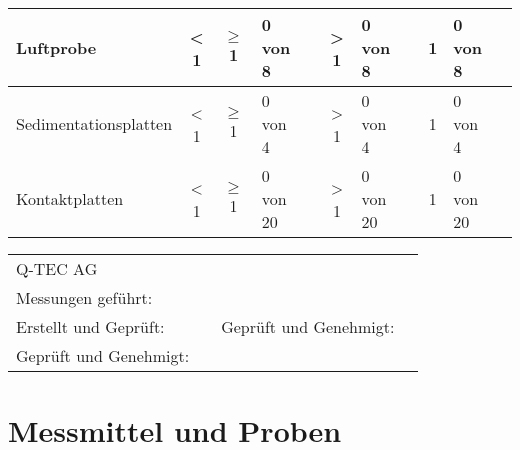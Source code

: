 \vspace{1ex}
\raum \qquad \kklasse \qquad \betriebszustand

\begin{tabularx}{\textwidth}{|l|c|c|X|c|c|X|c|c|X|c|}
	
	\hline
	Luftprobe & 
	< 1  & $\geq$ 1 & 0 von 8 & \CheckBox[print,width=0.6em,height=0.6em,checked,name=ch37]{}& > 1  & 0 von 8 &  \CheckBox[width=0.6em,height=0.6em,checked,name=ch38]{}&
	1 & 0 von 8 &  \CheckBox[print,width=0.6em,height=0.6em,checked,name=ch39]{} \\
	\hline
	Sedimentationsplatten & 
	< 1  & $\geq$ 1 & 0 von 4 & \CheckBox[print,width=0.6em,height=0.6em,checked,name=ch40]{}& > 1  & 0 von 4 &  \CheckBox[width=0.6em,height=0.6em,checked,name=ch41]{}&
	1 & 0 von 4 &  \CheckBox[width=0.6em,height=0.6em,checked,name=ch42]{} \\
	\hline
	Kontaktplatten & 
	< 1  & $\geq$ 1 & 0 von 20 & \CheckBox[print,width=0.6em,height=0.6em,checked,name=ch43]{}& > 1  & 0 von 20 &  \CheckBox[width=0.6em,height=0.6em,checked,name=ch44]{}&
	1 & 0 von 20 &  \CheckBox[print,width=0.6em,height=0.6em,checked,name=ch45]{} \\
	\hline
\end{tabularx}
\vspace{70pt}%


\begin{tabularx}{\textwidth}{p{4.5cm}XXp{4cm}}


	\multicolumn{2}{l}{Q-TEC AG}&	\multicolumn{2}{l}{\small{\kundeline}}\\


	\small{Messungen geführt:} &\underline{\hspace{3cm}} & \multirow{3}{8cm}{\small{Geprüft und Genehmigt:}}& \\


    \small{Erstellt und Geprüft:} &\underline{\hspace{3cm}} & &\qquad \underline{\hspace{3cm}}\\
    \small{Geprüft und Genehmigt:} &\underline{\hspace{3cm}}&&\\
	
	
\end{tabularx}

\chapter{Messmittel und Proben} \label{cha:messmittelPoben}
